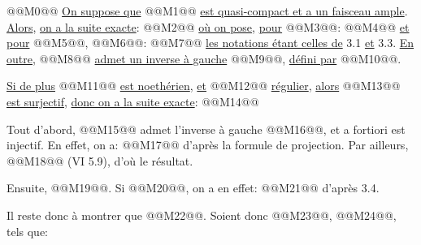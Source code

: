 
@@M0@@
\uline{On
suppose que} @@M1@@ \uline{est quasi-compact et a un faisceau ample}. \uline{Alors}, \uline{on a la suite exacte}:
@@M2@@
\uline{où on pose}, \uline{pour} @@M3@@:
@@M4@@
\uline{et pour} @@M5@@, @@M6@@:
@@M7@@
\uline{les notations étant celles de} 3.1 \uline{et} 3.3. \uline{En outre}, @@M8@@ \uline{admet un inverse à gauche} @@M9@@, \uline{défini par} @@M10@@.

\uline{Si de plus} @@M11@@ \uline{est noethérien}, \uline{et} @@M12@@ \uline{régulier}, \uline{alors} @@M13@@ \uline{est surjectif}, \uline{donc on a la suite exacte}:
@@M14@@

Tout d'abord, @@M15@@ admet l'inverse à gauche @@M16@@, et a fortiori est injectif. En effet, on a:
@@M17@@
d'après la formule de projection. Par ailleurs, @@M18@@ (VI 5.9), d'où le résultat.

Ensuite, @@M19@@. Si @@M20@@, on a en effet:
@@M21@@
d'après 3.4.

Il reste donc à montrer que @@M22@@. Soient donc @@M23@@, @@M24@@, tels que:
